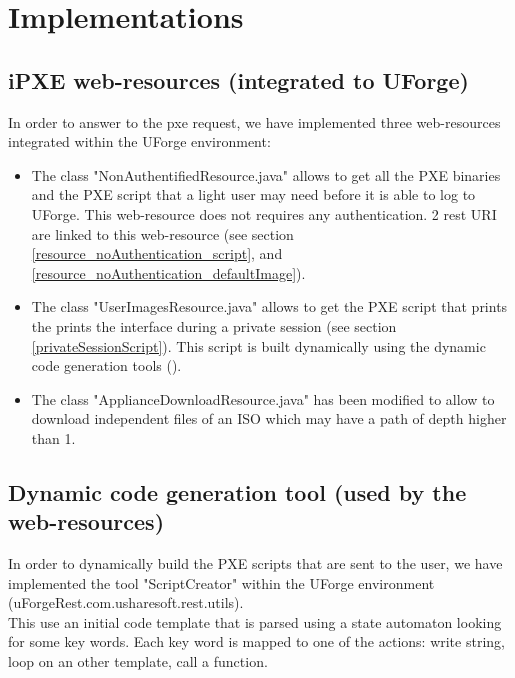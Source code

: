 \documentclass[12pt]{article}											%
\begin{document}
\section{Implementations}
\subsection{iPXE web-resources (integrated to UForge)}
	In order to answer to the pxe request, we have implemented three web-resources integrated within the UForge environment:
    \begin{itemize}
		\item The class "NonAuthentifiedResource.java" allows to get all the PXE binaries and the PXE script that a light user may need before it is able to log to UForge.   This web-resource does not requires any authentication.   2 rest URI are linked to this web-resource (see section \ref{resource_noAuthentication_script}, and \ref{resource_noAuthentication_defaultImage}).
		\item The class "UserImagesResource.java" allows to get the PXE script that prints the prints the interface during a private session (see section \ref{privateSessionScript}).   This script is built dynamically using the dynamic code generation tools ().
        \item The class "ApplianceDownloadResource.java" has been modified to allow to download independent files of an ISO which may have a path of depth higher than 1.
	\end{itemize}


\subsection{Dynamic code generation tool (used by the web-resources)} \label{codeGenerationTool}
	In order to dynamically build the PXE scripts that are sent to the user, we have implemented the tool "ScriptCreator" within the UForge environment (uForgeRest.com.usharesoft.rest.utils).\\
	This use an initial code template that is parsed using a state automaton looking for some key words.   Each key word is mapped to one of the actions: write string, loop on an other template, call a function. 
\end{document}
